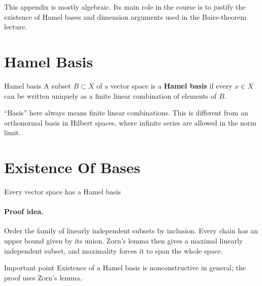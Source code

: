 \documentclass[11pt]{article}
\begin{document}

\vspace{0.8em}

\begin{focusbox}
This appendix is mostly algebraic. Its main role in the course is to justify the existence of Hamel bases and dimension arguments used in the Baire-theorem lecture.
\end{focusbox}

\tableofcontents

\section{Hamel Basis}

\begin{defbox}{Hamel basis}
A subset $B\subset X$ of a vector space is a \textbf{Hamel basis} if every $x\in X$ can be written uniquely as a finite linear combination of elements of $B$.
\end{defbox}

\begin{focusbox}
``Basis'' here always means finite linear combinations. This is different from an orthonormal basis in Hilbert spaces, where infinite series are allowed in the norm limit.
\end{focusbox}

\section{Existence Of Bases}

\begin{thmbox}{Every vector space has a Hamel basis}
\thmHamelBasis
\end{thmbox}

\paragraph{Proof idea.}
Order the family of linearly independent subsets by inclusion. Every chain has an upper bound given by its union. Zorn's lemma then gives a maximal linearly independent subset, and maximality forces it to span the whole space.

\begin{warningbox}{Important point}
Existence of a Hamel basis is nonconstructive in general; the proof uses Zorn's lemma.
\end{warningbox}
\end{document}
